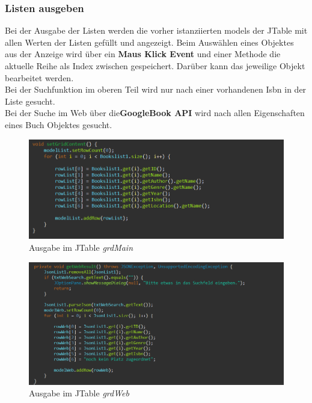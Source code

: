 \subsubsection{Listen ausgeben}

Bei der Ausgabe der Listen werden die vorher istanziierten models der JTable mit allen Werten der Listen gefüllt und angezeigt. Beim Auswählen eines Objektes aus der Anzeige wird über ein \textbf{Maus Klick Event} und einer Methode die aktuelle Reihe als Index zwischen gespeichert. Darüber kann das jeweilige Objekt bearbeitet werden.\\
Bei der Suchfunktion im oberen Teil wird nur nach einer vorhandenen Isbn in der Liste gesucht.\\
Bei der Suche im Web über die\textbf{GoogleBook API} wird nach allen Eigenschaften eines Buch Objektes gesucht.\\ 

\begin{figure}[h]
\begin{center}
\includegraphics[width=15cm]{img/setgridcontent.png}
\caption{Ausgabe im JTable \textit{grdMain}}
\label{setgridcontent}
\end{center}
\end{figure}

\begin{figure}[h]
\begin{center}
\includegraphics[width=15cm]{img/webgrid.png}
\caption{Ausgabe im JTable \textit{grdWeb}}
\label{webgrid}
\end{center}
\end{figure}



